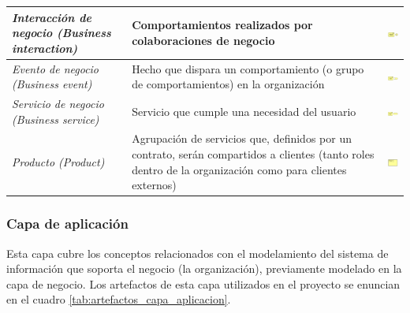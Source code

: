 \begin{center}
\begin{longtable}{|p{4cm}|p{6cm}|c|}
	\hline
	\textit{Interacción de negocio (Business interaction)} & 
    Comportamientos realizados por colaboraciones de negocio &  
    \includegraphics[width=1.5cm]{./imagenes/Archimate/businessinteraction.png}\\
	\hline
	\textit{Evento de negocio (Business event)} & 
    Hecho que dispara un comportamiento (o grupo de comportamientos) en la organización &  
    \includegraphics[width=1.5cm]{./imagenes/Archimate/businessevent.png}\\
	\hline
	\textit{Servicio de negocio (Business service)} & 
    Servicio que cumple una necesidad del usuario &  
    \includegraphics[width=1.5cm]{./imagenes/Archimate/businessservice.png}\\
	\hline
	\textit{Producto (Product)} & 
    Agrupación de servicios que, definidos por un contrato, serán compartidos a clientes (tanto roles dentro de la organización como para clientes externos) &  
    \includegraphics[width=1.5cm]{./imagenes/Archimate/businessproduct.png}\\
	\hline
  \end{longtable}
\end{center}

\subsubsection{Capa de aplicación} 

Esta capa cubre los conceptos relacionados con el modelamiento del sistema de información que soporta el negocio (la organización), previamente modelado en la capa de negocio. Los artefactos de esta capa utilizados en el proyecto se enuncian en el cuadro \ref{tab:artefactos_capa_aplicacion}.

